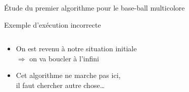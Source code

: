 \documentclass[final,hyperref={pdfpagelabels=false}]{beamer}
\renewenvironment{Coupe}{   }{   }
\begin{document}
\begin{Coupe}
\begin{frame}{Étude du premier algorithme pour le base-ball multicolore}
\begin{block}{Exemple d'exécution incorrecte}
\begin{columns}
      \begin{column}{.51\linewidth}
        \begin{itemize}
        \item On est revenu à notre situation initiale\\
          $\Rightarrow$ on va boucler à l'infini
        \item Cet algorithme ne marche pas ici, \\il faut chercher autre chose\ldots
        \end{itemize}
      \end{column}

    \end{columns}
  \end{block}
\end{frame}
\end{Coupe}
\newcommand{\ligneMaison}[2]{
  \begin{tikzpicture}
    \foreach \x/\col in {#1} {
      \draw (.55*\x,.65) node[shape=circle,fill=\col,draw=black,inner sep=.1] {~~~};
    }
    \foreach \x/\col in {#2} {
      \draw (.55*\x,.3) node[shape=circle,fill=\col,draw=black,inner sep=.1] {~~~};
    }
    \foreach \x/\col in {1/A, 2/B, 3/C, 4/D, 5/E} {
      \draw (.55*\x,-.25) node[shape=ellipse,fill=\col,draw=black,rotate=90] {~~};
    }
  \end{tikzpicture}
}
\end{document}
